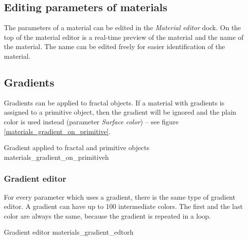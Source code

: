 \subsection{Editing parameters of materials}\label{materials-parameters}

The parameters of a material can be edited in the \emph{Material editor} dock. On the top of the material editor is a real-time preview of the material and the name of the material. The name can be edited freely for easier identification of the material.

\subsection{Gradients}\label{materials-gradients}

Gradients can be applied to fractal objects. If a material with gradients is assigned to a primitive object, then the gradient will be ignored and the plain color is used instead (parameter \emph{Surface color}) -- see figure \ref{materials_gradient_on_primitive}.

{Gradient applied to fractal and primitive objects}
{materials_gradient_on_primitive}{h}

\subsubsection{Gradient editor}\label{materials-gradient-editor}

For every parameter which uses a gradient, there is the same type of gradient editor. A gradient can have up to 100 intermediate colors. The first and the last color are always the same, because the gradient is repeated in a loop.

{Gradient editor}
{materials_gradient_edtor}{h}

